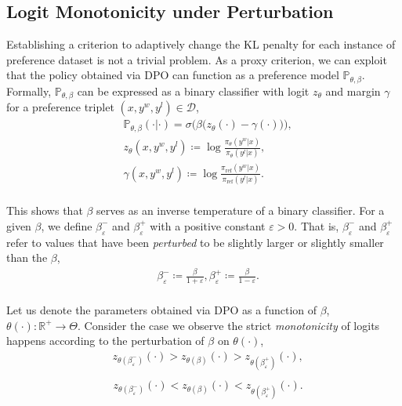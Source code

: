 \subsection{Logit Monotonicity under Perturbation}
Establishing a criterion to adaptively change the KL penalty for each instance of preference dataset is not a trivial problem. As a proxy criterion, we can exploit that the policy obtained via DPO can function as a preference model $\mathbb{P}_{\theta, \beta}$. Formally, $\mathbb{P}_{\theta, \beta}$ can be expressed as a binary classifier with logit $z_\theta$ and margin $\gamma$ for a preference triplet $(x, y^w, y^l) \in \mathcal{D}$,
\begin{equation*}
\begin{split}
& \mathbb{P}_{\theta, \beta}(\cdot | \cdot) = \sigma \Big( \beta \big( z_\theta(\cdot) - \gamma(\cdot) \big) \Big), \\
& z_\theta(x, y^w, y^l) \coloneqq \log \frac{\pi_\theta (y^w | x)}{\pi_\theta (y^l | x)}, \\
& \gamma(x, y^w, y^l) \coloneqq \log \frac{\pi_\text{ref} (y^w | x)}{\pi_\text{ref} (y^l | x)}. \\
\end{split}
\end{equation*}

This shows that $\beta$ serves as an inverse temperature of a binary classifier. For a given $\beta$, we define $\beta^-_\varepsilon$ and $\beta^+_\varepsilon$ with a positive constant $\varepsilon>0$. That is, $\beta^-_\varepsilon$ and $\beta^+_\varepsilon$ refer to values that have been \textit{perturbed} to be slightly larger or slightly smaller than the $\beta$,
\begin{equation*}
\begin{split}
& \beta^-_\varepsilon \coloneqq \frac{\beta}{1+\varepsilon}, \beta^+_\varepsilon \coloneqq \frac{\beta}{1-\varepsilon}. \\
\end{split}
\end{equation*}

Let us denote the parameters obtained via DPO as a function of $\beta$, $ \theta(\cdot): \mathbb{R}^+ \rightarrow \Theta$. Consider the case we observe the strict \textit{monotonicity} of logits happens according to the perturbation of $\beta$ on $\theta(\cdot)$,
\begin{equation}\label{eqn:overegularization}
\begin{split}
& z_{\theta(\beta^-_\varepsilon)}(\cdot) > z_{\theta(\beta)}(\cdot) > z_{\theta(\beta^+_\varepsilon)}(\cdot), \\
\end{split}
\end{equation}
\begin{equation}\label{eqn:underregularization}
\begin{split}
& z_{\theta(\beta^-_\varepsilon)}(\cdot) < z_{\theta(\beta)}(\cdot) < z_{\theta(\beta^+_\varepsilon)}(\cdot). \\
\end{split}
\end{equation}

